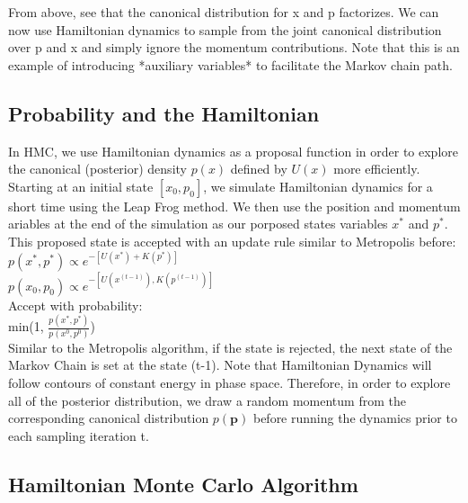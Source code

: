 \documentclass{article}
\begin{document}
From above, see that the canonical distribution for x and p factorizes. We can now use Hamiltonian dynamics to sample from the joint canonical distribution over p and x and simply ignore the momentum contributions. Note that this is an example of introducing *auxiliary variables* to facilitate the Markov chain path.

\subsection{Probability and the Hamiltonian}

In HMC, we use Hamiltonian dynamics as a proposal function in order to explore the canonical (posterior) density $p(x)$ defined by $U(x)$ more efficiently. Starting at an initial state $[x_0, p_0]$, we simulate Hamiltonian dynamics for a short time using the Leap Frog method. We then use the position and momentum ariables at the end of the simulation as our porposed states variables $x^*$ and $p^*$. This proposed state is accepted with an update rule similar to Metropolis before:\\

$p(x^*, p^*) \propto e^{-[U(x^*) + K(p^*)]}$ \\ $p(x_0, p_0) \propto e^{-[U(x^{(t-1)}), K(p^{(t-1)})]}$\\

Accept with probability:\\

min(1, $\frac{p(x^*, p^*)}{p(x^0, p^0)}$)\\

Similar to the Metropolis algorithm, if the state is rejected, the next state of the Markov Chain is set at the state (t-1). Note that Hamiltonian Dynamics will follow contours of constant energy in phase space. Therefore, in order to explore all of the posterior distribution, we draw a random momentum from the corresponding canonical distribution $p(\mathbf{p})$ before running the dynamics prior to each sampling iteration t.

\subsection{Hamiltonian Monte Carlo Algorithm}
\end{document}
